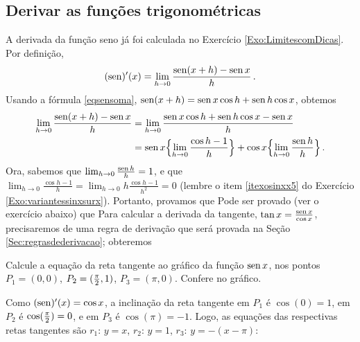 \subsection{Derivar as funções trigonométricas}
A derivada da função seno já foi calculada no Exercício
\ref{Exo:LimitescomDicas}. Por definição,
$$
(\operatorname{sen})'( x) 
=\lim_{h\to 0}\frac{\operatorname{sen} (x+h)-\operatorname{sen} x}{h}\,.
$$
Usando a fórmula \eqref{eqsensoma}, $\operatorname{sen} (x+h)=\operatorname{sen} x\cos h+\operatorname{sen} h\cos x$,
obtemos
\begin{align*}
\lim_{h\to 0}\frac{\operatorname{sen} (x+h)-\operatorname{sen} x}{h}
&=\lim_{h\to 0}\frac{\operatorname{sen} x\cos h+\operatorname{sen} h\cos x-\operatorname{sen} x}{h}\\
&=\operatorname{sen} x\Bigl\{\lim_{h\to 0}\frac{\cos h-1}{h}\Bigr\}+\cos x\Bigl\{\lim_{h\to
0}\frac{\operatorname{sen} h}{h}\Bigr\}\,.
\end{align*}
Ora, sabemos que $\lim_{h\to 0}\frac{\operatorname{sen} h}{h}=1$, e que 
$\lim_{h\to 0}\frac{\cos h-1}{h}=\lim_{h\to 0}h\frac{\cos h-1}{h^2}=0$ (lembre o
item \eqref{itexosinxx5} do Exercício \ref{Exo:variantessinxsurx}).
Portanto, provamos que
Pode ser provado (ver o exercício abaixo) que
Para calcular a derivada da tangente, $\tan x=\frac{\operatorname{sen} x}{\cos x}$,
precisaremos de uma regra de derivação que será provada na Seção
\ref{Sec:regrasdederivacao}; obteremos 
\begin{exo}\label{Exo:retastangentesseno}
Calcule a equação da reta tangente ao gráfico da função $\operatorname{sen} x$, nos pontos 
$P_1=(0,0)$, $P_2=(\tfrac{\pi}{2}, 1)$, $P_3=(\pi,0)$. Confere no gráfico.
\begin{sol}
Como $(\operatorname{sen})'(x)=\cos x$, a inclinação da reta tangente em $P_1$ é $\cos(0)=1$,
em $P_2$ é $\cos(\tfrac{\pi}{2})=0$, e em $P_3$ é $\cos(\pi)=-1$. Logo, as
equações das respectivas retas tangentes são $r_1$: $y=x$, $r_2$: $y=1$, $r_3$:
$y=-(x-\pi)$:
\begin{center}
\begin{bmlimage}\end{bmlimage}
\end{center}
\end{sol}
\end{exo}

